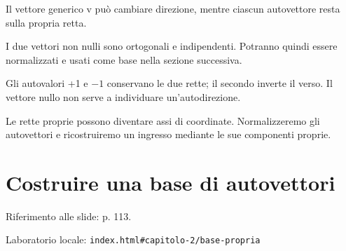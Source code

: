 
Il vettore generico v può cambiare direzione, mentre ciascun autovettore resta sulla propria retta.\par


\label{c2-spettro-example-2-step-4}


I due vettori non nulli sono ortogonali e indipendenti. Potranno quindi essere normalizzati e usati come base nella sezione successiva.\par



Gli autovalori +1 e \(- 1\) conservano le due rette; il secondo inverte il verso. Il vettore nullo non serve a individuare un'autodirezione.\par


Le rette proprie possono diventare assi di coordinate. Normalizzeremo gli autovettori e ricostruiremo un ingresso mediante le sue componenti proprie.\par


\Needspace{.43\textheight}
\section{Costruire una base di autovettori}
\label{c2-base-propria}

{\sffamily\small\color{Ink!70} Riferimento alle slide: p. 113.\par}

{\sffamily\small\color{Ink!70} Laboratorio locale: \nolinkurl{index.html#capitolo-2/base-propria}\par}


